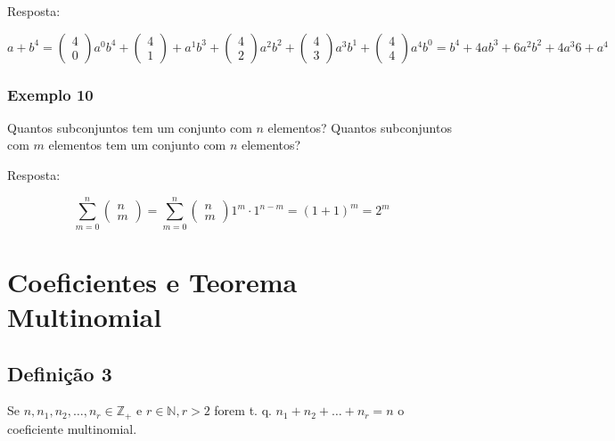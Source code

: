 \documentclass[a4paper]{article}
\begin{document}
	Resposta:
	
	$ a+b^{4} = \begin{pmatrix}
	4  \\
	0
	\end{pmatrix} a^{0} b^{4} + \begin{pmatrix}
	4  \\
	1
	\end{pmatrix} + a^{1} b^{3} + \begin{pmatrix}
	4  \\
	2
	\end{pmatrix} a^{2} b^{2} + \begin{pmatrix}
	4  \\
	3
	\end{pmatrix} a^{3} b^{1} + \begin{pmatrix}
	4  \\
	4
	\end{pmatrix} a^{4} b^{0} = b^{4} + 4ab^{3} + 6 a^{2} b^{2} + 4a^{3}6 + a^{4}$
	
	\subsubsection{Exemplo 10}
	
	\noindent Quantos subconjuntos tem um conjunto com $n$ elementos? Quantos subconjuntos com $m$ elementos tem um conjunto com $n$ elementos?
	
	Resposta:
	
	\begin{equation*}
	 \sum_{m=0}^{n} \begin{pmatrix}
	n  \\
	m
	\end{pmatrix} = \sum_{m=0}^{n} \begin{pmatrix}
	n  \\
	m
	\end{pmatrix} 1^{m} \cdot 1^{n-m} = (1+1)^{m} = 2^{m} 
	\end{equation*}
	
	\section{Coeficientes e Teorema Multinomial}
	
	\subsection{Definição 3}
	
	Se $ n, n_{1}, n_{2}, \dots, n_{r} \in \mathbb{Z}_{+}$ e $r \in \mathbb{N}, r > 2$ forem t. q. $n_{1} + n_{2} + \dots + n_{r} = n$ o coeficiente multinomial.
	
\end{document}
